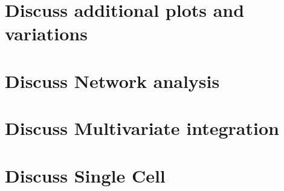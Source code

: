 \documentclass[
]{book}
\begin{document}
\hypertarget{discuss-additional-plots-and-variations}{%
\section{Discuss additional plots and variations}\label{discuss-additional-plots-and-variations}}

\hypertarget{discuss-network-analysis}{%
\section{Discuss Network analysis}\label{discuss-network-analysis}}

\hypertarget{discuss-multivariate-integration}{%
\section{Discuss Multivariate integration}\label{discuss-multivariate-integration}}

\hypertarget{discuss-single-cell}{%
\section{Discuss Single Cell}\label{discuss-single-cell}}

  
\end{document}
